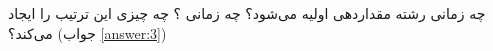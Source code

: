 \section{}
\paragraph{}\label{hint:150}
چه زمانی رشته  مقداردهی اولیه می‌شود؟ چه زمانی ؟ چه چیزی این ترتیب را ایجاد می‌کند؟ (جواب \ref{answer:3})